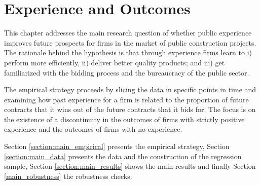 \chapter{Experience and Outcomes
}
This chapter addresses the main research question of whether public experience improves future prospects for firms in the market of public construction projects.  The rationale behind the hypothesis is that through experience firms learn to i) perform more efficiently, ii) deliver better quality products; and iii) get familiarized with the bidding process and the bureaucracy of the public sector.

The empirical strategy proceeds by slicing the data in specific points in time and examining how past experience for a firm is related to the proportion of future contracts that it wins out of the future contracts that it bids for. The focus is on the existence of a discontinuity in the outcomes of firms with strictly positive experience and the outcomes of firms with no experience.

Section \ref{section:main_empirical} presents the empirical strategy, Section \ref{section:main_data} presents the data and the construction of the regression sample, Section \ref{section:main_results} shows the main results and finally Section \ref{main_robustness} the robustness checks.




